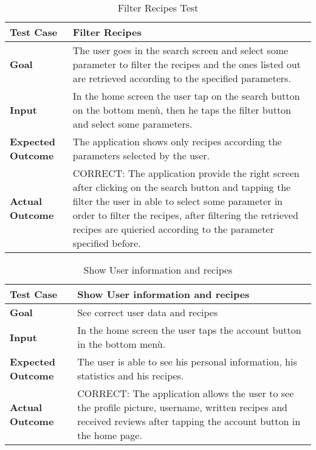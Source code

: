 \begin{table}[H]
	\centering
	\begin{tabular}{|l|l|}
	\hline
	\textbf{Test Case}& Filter Recipes\\
	\hline
	\textbf{Goal}& 
	\begin{minipage}{.7\linewidth}
	The user goes in the search screen and select some parameter to filter the recipes and the ones listed out are retrieved according to the specified parameters.
	\end{minipage}\\
	\hline
	\textbf{Input}& 
	\begin{minipage}{.7\linewidth}
	In the home screen the user tap on the search button on the bottom menù, then he taps the filter button and select some parameters.
	\end{minipage}\\
	\hline
	\textbf{Expected Outcome}& 
	\begin{minipage}{.7\linewidth}
	The application shows only recipes according the parameters selected by the user.
	\end{minipage}\\
	\hline
	\textbf{Actual Outcome}& 
	\begin{minipage}{.7\linewidth}
	CORRECT: The application provide the right screen after clicking on the search button and tapping the filter the user in able to select some parameter in order to filter the recipes, after filtering the retrieved recipes are quieried according to the parameter specified before.
	\end{minipage}\\
	\hline	
	\end{tabular}
	\caption{Filter Recipes Test}
\end{table}

\begin{table}[H]
	\centering
	\begin{tabular}{|l|l|}
	\hline
	\textbf{Test Case}& Show User information and recipes\\
	\hline
	\textbf{Goal}& See correct user data and recipes\\
	\hline
	\textbf{Input}& 
	\begin{minipage}{.7\linewidth}
	In the home screen the user taps the account button in the bottom menù.
	\end{minipage}\\
	\hline
	\textbf{Expected Outcome}& 
	\begin{minipage}{.7\linewidth}
	The user is able to see his personal information, his statistics and his recipes.
	\end{minipage}\\
	\hline
	\textbf{Actual Outcome}&
	\begin{minipage}{.7\linewidth}
	CORRECT: The application allows the user to see the profile picture, username, written recipes and received reviews after tapping the account button in the home page.
	\end{minipage}\\
	\hline	
	\end{tabular}
	\caption{Show User information and recipes}
\end{table}

